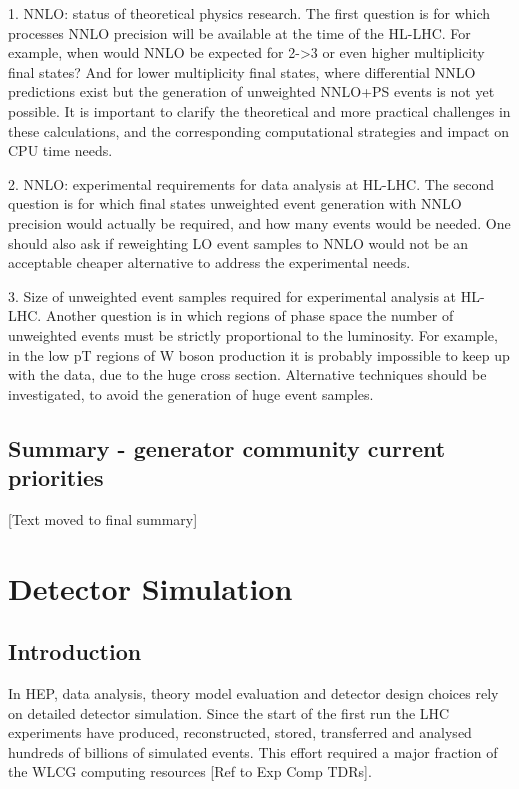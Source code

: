 \documentclass[10pt,a4paper]{article}
\begin{document}
1. {NNLO: status of theoretical physics research}. The first question is
for which processes NNLO precision will be available at the time of the
HL-LHC. For example, when would NNLO be expected for 2-\textgreater3 or
even higher multiplicity final states? And for lower multiplicity final
states, where differential NNLO predictions exist but the generation of
unweighted NNLO+PS events is not yet possible. It is important to
clarify the theoretical and more practical challenges in these
calculations, and the corresponding computational strategies and impact
on CPU time needs.

2. {NNLO: experimental requirements for data analysis at HL-LHC}. The
second question is for which final states unweighted event generation
with NNLO precision would actually be required, and how many events
would be needed. One should also ask if reweighting LO event samples to
NNLO would not be an acceptable cheaper alternative to address the
experimental needs.

3. {Size of unweighted event samples required for experimental analysis
at HL-LHC}. Another question is in which regions of phase space the
number of unweighted events must be strictly proportional to the
luminosity. For example, in the low pT regions of W boson production it
is probably impossible to keep up with the data, due to the huge cross
section. Alternative techniques should be investigated, to avoid the
generation of huge event samples.

\hypertarget{summary---generator-community-current-priorities}{%
\subsection{Summary - generator community current
priorities}\label{summary---generator-community-current-priorities}}

{[}Text moved to final summary{]}


\hypertarget{detector-simulation}{%
\section{Detector Simulation}\label{detector-simulation}}

\hypertarget{introduction-2}{%
\subsection{Introduction}\label{introduction-2}}

In HEP, data analysis, theory model evaluation and detector design
choices rely on detailed detector simulation. Since the start of the
first run the LHC experiments have produced, reconstructed, stored,
transferred and analysed hundreds of billions of simulated events. This
effort required a major fraction of the WLCG computing resources {[}Ref
to Exp Comp TDRs{]}.
\end{document}
